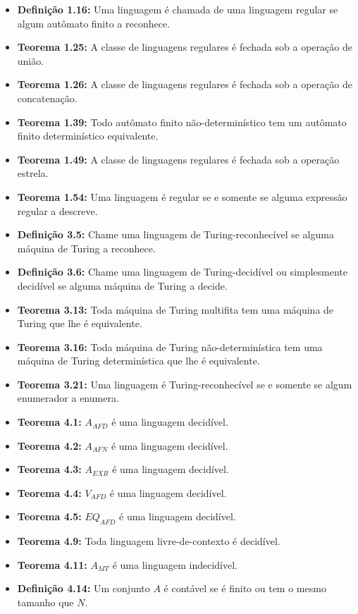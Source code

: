 \documentclass[12pt,a4paper,oneside]{article}
\begin{document}
\begin{itemize}
	
	\item[] {\bf Definição 1.16:} Uma linguagem é chamada de uma linguagem regular se algum autômato finito a reconhece.
	\item[] {\bf Teorema 1.25:} A classe de linguagens regulares é fechada sob a operação de união.
	\item[] {\bf Teorema 1.26:} A classe de linguagens regulares é fechada sob a operação de concatenação.
	\item[] {\bf Teorema 1.39:} Todo autômato finito não-determinístico tem um autômato finito determinístico
	equivalente.
	\item[] {\bf Teorema 1.49:} A classe de linguagens regulares é fechada sob a operação estrela.
	\item[] {\bf Teorema 1.54:} Uma linguagem é regular se e somente se alguma expressão regular a descreve.
	\item[] {\bf Definição 3.5:} Chame uma linguagem de Turing-reconhecível se alguma máquina de Turing a reconhece.
	\item[] {\bf Definição 3.6:} Chame uma linguagem de Turing-decidível ou simplesmente decidível se alguma máquina de Turing a decide.
	\item[] {\bf Teorema 3.13:} Toda máquina de Turing multifita tem uma máquina de Turing que lhe é equivalente.
	\item[] {\bf Teorema 3.16:} Toda máquina de Turing não-determinística tem uma máquina de Turing determinística que lhe é equivalente.
	\item[] {\bf Teorema 3.21:} Uma linguagem é Turing-reconhecível se e somente se algum enumerador a enumera.
	\item[] {\bf Teorema 4.1:} $A_{AFD}$ é uma linguagem decidível.
	\item[] {\bf Teorema 4.2:} $A_{AFN}$ é uma linguagem decidível.
	\item[] {\bf Teorema 4.3:} $A_{EXR}$ é uma linguagem decidível.
	\item[] {\bf Teorema 4.4:} $V_{AFD}$ é uma linguagem decidível.
	\item[] {\bf Teorema 4.5:} $EQ_{AFD}$ é uma linguagem decidível.
	\item[] {\bf Teorema 4.9:} Toda linguagem livre-de-contexto é decidível.
	\item[] {\bf Teorema 4.11:} $A_{MT}$ é uma linguagem indecidível.
	\item[] {\bf Definição 4.14:} Um conjunto $A$ é contável se é finito ou tem o mesmo tamanho que $N$.
\end{itemize}
\end{document}
